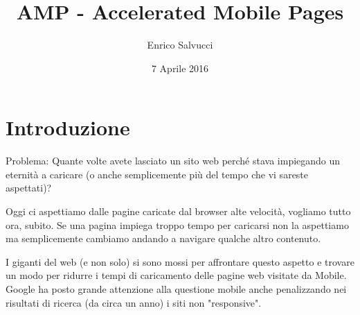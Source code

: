 \documentclass[a4paper]{article}
\title{AMP - Accelerated Mobile Pages}
\author{Enrico Salvucci}
\date{7 Aprile 2016}
\begin{document}
\maketitle

\newpage

\tableofcontents

\newpage
\section{Introduzione}

Problema: Quante volte avete lasciato un sito web perché stava impiegando un eternità a caricare (o anche semplicemente più del tempo che vi sareste aspettati)?

Oggi ci aspettiamo dalle pagine caricate dal browser alte velocità, vogliamo tutto ora, subito. Se una pagina impiega troppo tempo per caricarsi non la aspettiamo ma semplicemente cambiamo andando a navigare qualche altro contenuto.

I giganti del web (e non solo) si sono mossi per affrontare questo aspetto e trovare un modo per ridurre i tempi di caricamento delle pagine web visitate da Mobile.
Google ha posto grande attenzione alla questione mobile anche penalizzando nei risultati di ricerca (da circa un anno) i siti non "responsive".
\end{document}
